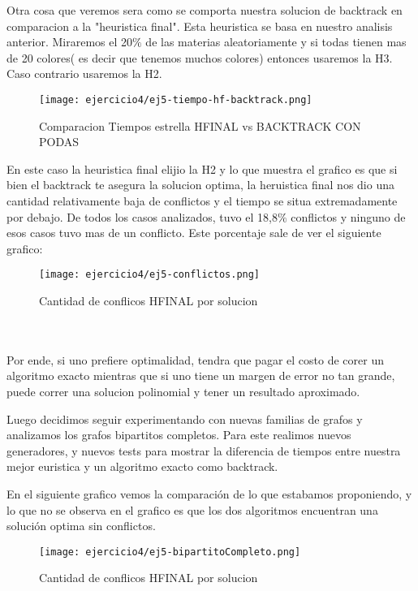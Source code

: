 Otra cosa que veremos sera como se comporta nuestra solucion de backtrack en comparacion a la "heuristica final". Esta heuristica se basa en nuestro analisis anterior. Miraremos el 20$\%$ de las materias aleatoriamente y si todas tienen mas de 20 colores( es decir que tenemos muchos colores) entonces usaremos la H3. Caso contrario usaremos la H2.


\begin{figure}[h!]
\texttt{[image: ejercicio4/ej5-tiempo-hf-backtrack.png]}
\centering
\caption{Comparacion Tiempos estrella HFINAL vs BACKTRACK CON PODAS}
\label{overflow3}
\end{figure}

\pagebreak

En este caso la heuristica final elijio la H2 y lo que muestra el grafico es que si bien el backtrack te asegura la solucion optima, la heruistica final nos dio una cantidad relativamente baja de conflictos y el tiempo se situa extremadamente por debajo. De todos los casos analizados, tuvo el 18,8$\%$ conflictos y ninguno de esos casos tuvo mas de un conflicto. Este porcentaje sale de ver el siguiente grafico: 

\begin{figure}[h!]
\texttt{[image: ejercicio4/ej5-conflictos.png]}
\centering
\caption{Cantidad de conflicos HFINAL por solucion}
\label{overflow3}
\end{figure}
\\
\\
Por ende, si uno prefiere optimalidad, tendra que pagar el costo de corer un algoritmo exacto mientras que si uno tiene un margen de error no tan grande, puede correr una solucion polinomial y tener un resultado aproximado.

Luego decidimos seguir experimentando con nuevas familias de grafos y analizamos los grafos bipartitos completos. Para este realimos nuevos generadores, y nuevos tests para mostrar la diferencia de tiempos entre nuestra mejor euristica y un algoritmo exacto como backtrack.


En el siguiente grafico vemos la comparaci\'on de lo que estabamos proponiendo, y lo que no se observa en el grafico es que los dos algoritmos encuentran una soluci\'on optima sin conflictos.

\begin{figure}[h!]
\texttt{[image: ejercicio4/ej5-bipartitoCompleto.png]}
\centering
\caption{Cantidad de conflicos HFINAL por solucion}
\label{overflow3}
\end{figure}

